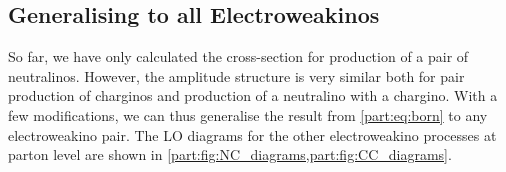 \documentclass[../main.tex]{subfiles}
\begin{document}


\subsection{Generalising to all Electroweakinos}
So far, we have only calculated the cross-section for production of a pair of neutralinos.
However, the amplitude structure is very similar both for pair production of charginos and production of a neutralino with a chargino.
With a few modifications, we can thus generalise the result from \cref{part:eq:born} to any electroweakino pair.
The LO diagrams for the other electroweakino processes at parton level are shown in \cref{part:fig:NC_diagrams,part:fig:CC_diagrams}.

\begin{figure}[ht!]
  \centering
  \caption{}
  \label{part:fig:NC_diagrams}
\end{figure}
\end{document}
